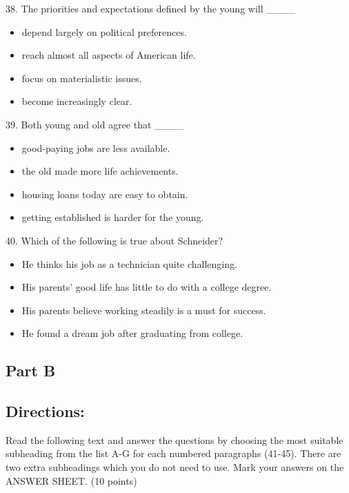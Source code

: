 \documentclass[UTF8,11pt]{ctexart}
\begin{document}
38. The priorities and expectations defined by the young will \_\_\_\_


\begin{itemize}[leftmargin=2em,itemsep=.2em,topsep=.4em]\item[A.] depend largely on political preferences.
\item[B.] reach almost all aspects of American life.
\item[C.] focus on materialistic issues.
\item[D.] become increasingly clear.
\end{itemize}

39. Both young and old agree that \_\_\_\_


\begin{itemize}[leftmargin=2em,itemsep=.2em,topsep=.4em]\item[A.] good-paying jobs are less available.
\item[B.] the old made more life achievements.
\item[C.] housing loans today are easy to obtain.
\item[D.] getting established is harder for the young.
\end{itemize}

40. Which of the following is true about Schneider?


\begin{itemize}[leftmargin=2em,itemsep=.2em,topsep=.4em]\item[A.] He thinks his job as a technician quite challenging.
\item[B.] His parents’ good life has little to do with a college degree.
\item[C.] His parents believe working steadily is a must for success.
\item[D.] He found a dream job after graduating from college.
\end{itemize}

\subsection*{\textbf{Part B}}


\subsection*{\textbf{Directions:}}


Read the following text and answer the questions by choosing the most suitable subheading from the list A-G for each numbered paragraphs (41-45). There are two extra subheadings which you do not need to use. Mark your answers on the ANSWER SHEET. (10 points)
\end{document}
